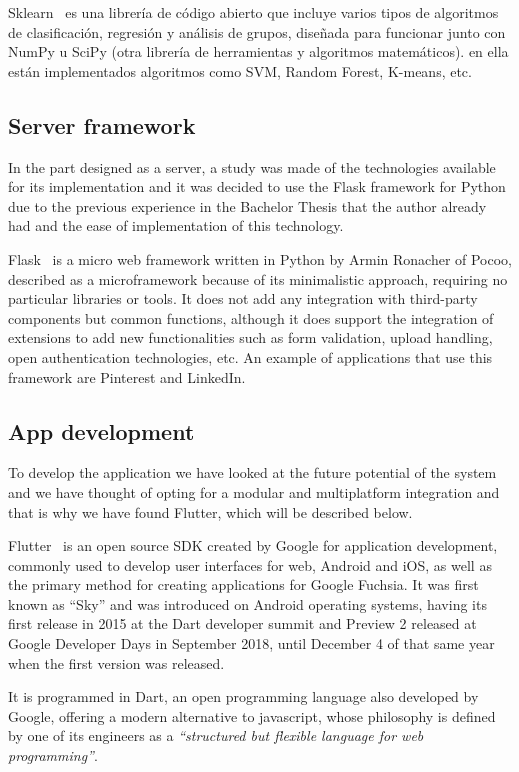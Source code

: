 Sklearn~\cite{scikitle66:online} es una librería de código abierto que incluye varios tipos de algoritmos de clasificación, regresión y análisis de grupos, diseñada para funcionar junto con NumPy u SciPy (otra librería de herramientas y algoritmos matemáticos). en ella están implementados algoritmos como SVM, Random Forest, K-means, etc.





\subsection{Server framework}
In the part designed as a server, a study was made of the technologies available for its implementation and it was decided to use the Flask framework for Python due to the previous experience in the Bachelor Thesis that the author already had and the ease of implementation of this technology.

Flask~\cite{Welcomet8:online} is a micro web framework written in Python by Armin Ronacher of Pocoo, described as a microframework because of its minimalistic approach, requiring no particular libraries or tools. It does not add any integration with third-party components but common functions, although it does support the integration of extensions to add new functionalities such as form validation, upload handling, open authentication technologies, etc. An example of applications that use this framework are Pinterest and LinkedIn.


\subsection{App development}
To develop the application we have looked at the future potential of the system and we have thought of opting for a modular and multiplatform integration and that is why we have found Flutter, which will be described below.

Flutter~\cite{FlutterB22:online} is an open source SDK created by Google for application development, commonly used to develop user interfaces for web, Android and iOS, as well as the primary method for creating applications for Google Fuchsia. It was first known as ``Sky'' and was introduced on Android operating systems, having its first release in 2015 at the Dart developer summit and Preview 2 released at Google Developer Days in September 2018, until December 4 of that same year when the first version was released.

It is programmed in Dart, an open programming language also developed by Google, offering a modern alternative to javascript, whose philosophy is defined by one of its engineers as a \textit{``structured but flexible language for web programming''}.



